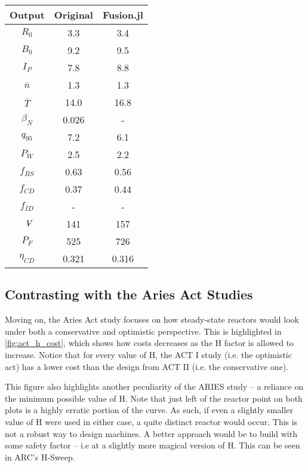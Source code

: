 \begin{table}[h!]
\begin{subtable}[t]{0.5\textwidth}
\begin{tabular}{ c|c|c }
Output           & Original         & Fusion.jl        \\
\hline
$R_{0}$          & 3.3              & 3.4           \\
$B_{0}$          & 9.2              & 9.5           \\
$I_{P}$          & 7.8              & 8.8           \\
$\overline n$    & 1.3              & 1.3           \\
$\overline T$    & 14.0             & 16.8           \\
$\beta_{N}$       & 0.026           & -          \\
$q_{95}$         & 7.2              & 6.1           \\
$P_{W}$          & 2.5              & 2.2           \\
$f_{BS}$         & 0.63             & 0.56          \\
$f_{CD}$         & 0.37             & 0.44          \\
$f_{ID}$         & -              & -             \\
$\volume$         & 141            & 157           \\
$P_{F}$          & 525            & 726           \\
$\eta_{CD}$      & 0.321            & 0.316          \\

\end{tabular}
\end{subtable}
\hfill
\hfill
\end{table}

\newpage

\subsection{Contrasting with the Aries Act Studies}

Moving on, the Aries Act study focuses on how steady-state reactors would look under both a conservative and optimistic perspective. This is highlighted in \cref{fig:act_h_cost}, which shows how costs decreases as the H factor is allowed to increase. Notice that for every value of H, the ACT I study (i.e. the optimistic act) has a lower cost than the design from ACT II (i.e. the conservative one).

This figure also highlights another peculiarity of the ARIES study -- a reliance on the minimum possible value of H. Note that just left of the reactor point on both plots is a highly erratic portion of the curve. As such, if even a slightly smaller value of H were used in either case, a quite distinct reactor would occur. This is not a robust way to design machines. A better approach would be to build with some safety factor -- i.e at a slightly more magical version of H. This can be seen in ARC's H-Sweep.

